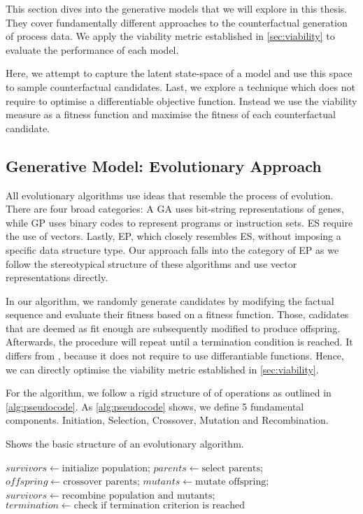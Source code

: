 \documentclass[./../../paper.tex]{subfiles}
\begin{document}
This section dives into the generative models that we will explore in this thesis. They cover fundamentally different approaches to the counterfactual generation of process data. We apply the viability metric established in \autoref{sec:viability} to evaluate the performance of each model.


Here, we attempt to capture the latent state-space of a model and use this space to sample counterfactual candidates.  Last, we explore a technique which does not require to optimise a differentiable objective function. Instead we use the viability measure as a fitness function and maximise the fitness of each counterfactual candidate.


\subsection{Generative Model: Evolutionary Approach}
\label{sec:evolutionary}
All evolutionary algorithms use ideas that resemble the process of evolution. There are four broad categories: A \gls{GA} uses bit-string representations of genes, while \gls{GP} uses binary codes to represent programs or instruction sets. \gls{ES} require the use of vectors. Lastly, \gls{EP}, which closely resembles \gls{ES}, without imposing a specific data structure type. Our approach falls into the category of \gls{EP} as we follow the stereotypical structure of these algorithms and use vector representations directly.

In our algorithm, we randomly generate candidates by modifying the factual sequence and evaluate their fitness based on a fitness function. Those, cadidates that are deemed as fit enough are subsequently modified to produce offspring. Afterwards, the procedure will repeat until a termination condition is reached. It differs from , because it does not require to use differantiable functions. Hence, we can directly optimise the viability metric established in \autoref{sec:viability}.

For the algorithm, we follow a rigid structure of of operations as outlined in \autoref{alg:pseudocode}. As \autoref{alg:pseudocode} shows, we define 5 fundamental components. Initiation, Selection, Crossover, Mutation and Recombination.

\begin{algorithm}[htb!]
    \label{alg:evolutionary}
    \caption{Shows the basic structure of an evolutionary algorithm.}
    \begin{algorithmic}
        \State $survivors \gets \text{initialize population}$;
        \State $parents \gets \text{select parents}$;
        \State $offspring \gets \text{crossover parents}$;
        \State $mutants \gets \text{mutate offspring}$;
        \State $survivors \gets \text{recombine population and mutants}$;
        \State $termination \gets \text{check if termination criterion is reached}$
        \EndWhile
    \end{algorithmic}
\end{algorithm}
\end{document}
